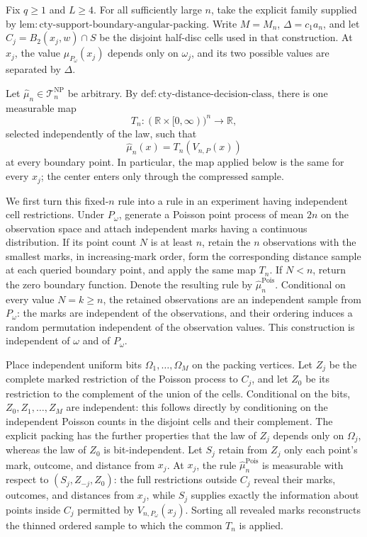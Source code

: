 Fix \(q\geq1\) and \(L\geq4\).  For all sufficiently large \(n\), take the explicit family supplied by \(\mathrm{lem:cty\text{-}support\text{-}boundary\text{-}angular\text{-}packing}\).  Write \(M=M_n\), \(\Delta=c_1a_n\), and let \(C_j=B_2(x_j,w)\cap S\) be the disjoint half-disc cells used in that construction.  At \(x_j\), the value \(\mu_{P_\omega}(x_j)\) depends only on \(\omega_j\), and its two possible values are separated by \(\Delta\).

Let \(\widehat\mu_n\in\mathcal T_n^{\mathrm{NP}}\) be arbitrary.  By \(\mathrm{def:cty\text{-}distance\text{-}decision\text{-}class}\), there is one measurable map
\[
 T_n:(\mathbb R\times[0,\infty))^n\longrightarrow\mathbb R,
\]
selected independently of the law, such that
\[
 \widehat\mu_n(x)=T_n(V_{n,P}(x))
\]
at every boundary point.  In particular, the map applied below is the same for every \(x_j\); the center enters only through the compressed sample.

We first turn this fixed-\(n\) rule into a rule in an experiment having independent cell restrictions.  Under \(P_\omega\), generate a Poisson point process of mean \(2n\) on the observation space and attach independent marks having a continuous distribution.  If its point count \(N\) is at least \(n\), retain the \(n\) observations with the smallest marks, in increasing-mark order, form the corresponding distance sample at each queried boundary point, and apply the same map \(T_n\).  If \(N<n\), return the zero boundary function.  Denote the resulting rule by \(\widehat\mu_n^{\mathrm{Pois}}\).  Conditional on every value \(N=k\geq n\), the retained observations are an independent sample from \(P_\omega\): the marks are independent of the observations, and their ordering induces a random permutation independent of the observation values.  This construction is independent of \(\omega\) and of \(P_\omega\).

Place independent uniform bits \(\Omega_1,\ldots,\Omega_M\) on the packing vertices.  Let \(Z_j\) be the complete marked restriction of the Poisson process to \(C_j\), and let \(Z_0\) be its restriction to the complement of the union of the cells.  Conditional on the bits, \(Z_0,Z_1,\ldots,Z_M\) are independent: this follows directly by conditioning on the independent Poisson counts in the disjoint cells and their complement.  The explicit packing has the further properties that the law of \(Z_j\) depends only on \(\Omega_j\), whereas the law of \(Z_0\) is bit-independent.  Let \(S_j\) retain from \(Z_j\) only each point's mark, outcome, and distance from \(x_j\).  At \(x_j\), the rule \(\widehat\mu_n^{\mathrm{Pois}}\) is measurable with respect to \((S_j,Z_{-j},Z_0)\): the full restrictions outside \(C_j\) reveal their marks, outcomes, and distances from \(x_j\), while \(S_j\) supplies exactly the information about points inside \(C_j\) permitted by \(V_{n,P_\omega}(x_j)\).  Sorting all revealed marks reconstructs the thinned ordered sample to which the common \(T_n\) is applied.

